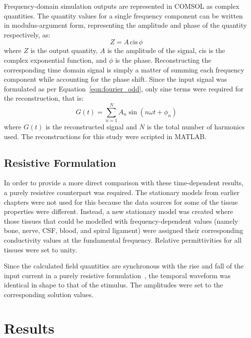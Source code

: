 Frequency-domain simulation outputs are represented in COMSOL as complex
quantities. The quantity values for a single frequency component can be written
in modulus-argument form, representing the amplitude and phase of the quantity
respectively, as:
\begin{equation}
	Z = A \, \mathrm{cis} \, \phi
	\label{eqn:complex_output}
\end{equation}
where $ Z $ is the output quantity, $ A $ is the amplitude of the signal, cis
is the complex exponential function, and $ \phi $ is the phase. Reconstructing
the corresponding time domain signal is simply a matter of summing each frequency
component while accounting for the phase shift. Since the input signal was
formulated as per Equation~\ref{eqn:fourier_odd}, only sine terms were required
for the reconstruction, that is:
\begin{equation}
	G(t) = \sum_{n=1}^N A_n \sin(n \omega t + \phi_n)
	\label{eqn:fourier_recon}
\end{equation}
where $ G(t) $ is the reconstructed signal and $ N $ is the total number of
harmonics used. The reconstructions for this study were scripted in MATLAB.

\subsection{Resistive Formulation}

In order to provide a more direct comparison with these time-dependent results,
a purely resistive counterpart was required. The stationary models from earlier
chapters were not used for this because the data sources for some of the tissue
properties were different. Instead, a new stationary model was created where
those tissues that could be modelled with frequency-dependent values (namely
bone, nerve, CSF, blood, and spiral ligament) were assigned their corresponding
conductivity values at the fundamental frequency. Relative permittivities for
all tissues were set to unity.

Since the calculated field quantities are synchronous with the rise and fall of
the input current in a purely resistive formulation~\cite{plonsey1967}, the temporal
waveform was identical in shape to that of the stimulus. The amplitudes were set
to the corresponding solution values.

\section{Results}

